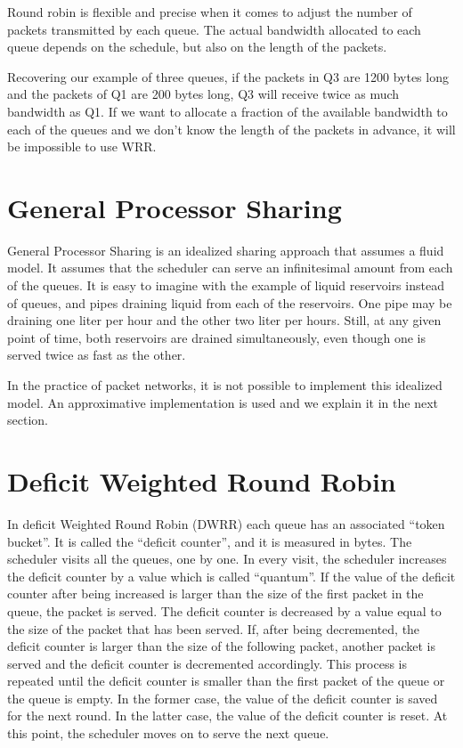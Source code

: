 Round robin is flexible and precise when it comes to adjust the number of packets transmitted by each queue.
The actual bandwidth allocated to each queue depends on the schedule, but also on the length of the packets.

Recovering our example of three queues, if the packets in Q3 are 1200 bytes long and the packets of Q1 are 200 bytes long, Q3 will receive twice as much bandwidth as Q1.
If we want to allocate a fraction of the available bandwidth to each of the queues and we don't know the length of the packets in advance, it will be impossible to use WRR.

\section{General Processor Sharing}

General Processor Sharing is an idealized sharing approach that assumes a fluid model.
It assumes that the scheduler can serve an infinitesimal amount from each of the queues.
It is easy to imagine with the example of liquid reservoirs instead of queues, and pipes draining liquid from each of the reservoirs.
One pipe may be draining one liter per hour and the other two liter per hours.
Still, at any given point of time, both reservoirs are drained simultaneously, even though one is served twice as fast as the other.

In the practice of packet networks, it is not possible to implement this idealized model.
An approximative implementation is used and we explain it in the next section.

\section{Deficit Weighted Round Robin}

In deficit Weighted Round Robin (DWRR) each queue has an associated ``token bucket''.
It is called the ``deficit counter'', and it is measured in bytes.
The scheduler visits all the queues, one by one.
In every visit, the scheduler increases the deficit counter by a value which is called ``quantum''.
If the value of the deficit counter after being increased is larger than the size of the first packet in the queue, the packet is served.
The deficit counter is decreased by a value equal to the size of the packet that has been served.
If, after being decremented, the deficit counter is larger than the size of the following packet, another packet is served and the deficit counter is decremented accordingly.
This process is repeated until the deficit counter is smaller than the first packet of the queue or the queue is empty.
In the former case, the value of the deficit counter is saved for the next round.
In the latter case, the value of the deficit counter is reset.
At this point, the scheduler moves on to serve the next queue.

